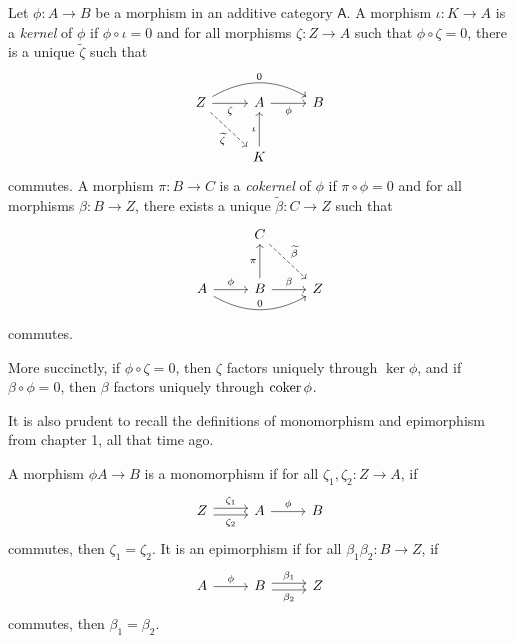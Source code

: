 \begin{definition}\label{dfn:9.2}
	Let $\phi : A \to B$ be a morphism in an additive category $\mathsf{A} $. A morphism $\iota : K \to A$ is a \emph{kernel} of $\phi $ if $\phi \circ \iota =0$ and for all morphisms $\zeta : Z \to A$ such that $\phi \circ \zeta =0$, there is a unique $\widetilde{\zeta } $ such that
	\[\begin{tikzcd}[row sep = 2.5em, column sep = 2.5em]
		Z\arrow[rr, bend left, "0"]\arrow[r, "\zeta "']\arrow[dr, dashed, " \widetilde{\zeta } "']&A\arrow[r, "\phi "']&B\\							&K\arrow[u, "\iota "]
	\end{tikzcd}\]
	commutes. A morphism $\pi : B \to C$ is a \emph{cokernel} of $\phi $ if $\pi \circ \phi =0$ and for all morphisms $\beta : B \to Z$, there exists a unique $\widetilde{\beta } : C \to Z$ such that
	\[\begin{tikzcd}[row sep = 2.5em, column sep = 2.5em]
		&C\arrow[dr, dashed, " \widetilde{\beta } "]\\
		A\arrow[r, "\phi "]\arrow[rr, bend right, "0"]&B\arrow[u, "\pi "]\arrow[r, "\beta "]&Z
	\end{tikzcd}\]
	commutes.
\end{definition}

More succinctly, if $\phi \circ \zeta =0$, then $\zeta $ factors uniquely through $\ker \phi $, and if $\beta \circ \phi =0$, then $\beta $ factors uniquely through $\operatorname{coker} \phi $.

It is also prudent to recall the definitions of monomorphism and epimorphism from chapter 1, all that time ago.
\begin{definition}\label{dfn:9.3}
	A morphism $\phi A \to B$ is a monomorphism if for all $\zeta_1,\zeta _2: Z \to A$, if
	\[\begin{tikzcd}[row sep = 2.5em, column sep = 2.5em]
		Z\arrow[r, "\zeta_1", shift left]\arrow[r, "\zeta _2"', shift right]&A\arrow[r, "\phi "]&B
	\end{tikzcd}\]
	commutes, then $\zeta _1=\zeta _2$. It is an epimorphism if for all $\beta _1\beta _2: B \to Z$, if
	\[\begin{tikzcd}[row sep = 2.5em, column sep = 2.5em]
		A\arrow[r, "\phi "]&B\arrow[r, shift left, "\beta _1"]\arrow[r, shift right, "\beta _2"']&Z
	\end{tikzcd}\]
	commutes, then $\beta _1=\beta _2$.
\end{definition}

